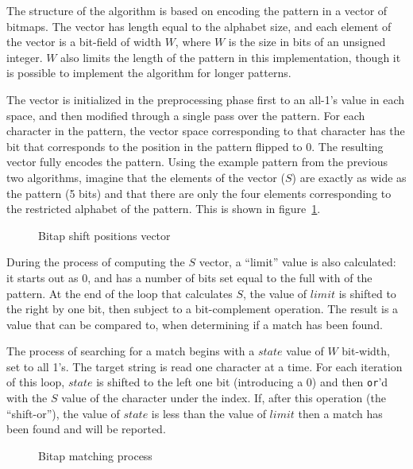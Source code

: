 The structure of the algorithm is based on encoding the pattern in a vector of bitmaps. The vector has length equal to the alphabet size, and each element of the vector is a bit-field of width $W$, where $W$ is the size in bits of an unsigned integer. $W$ also limits the length of the pattern in this implementation, though it is possible to implement the algorithm for longer patterns.

The vector is initialized in the preprocessing phase first to an all-1's value in each space, and then modified through a single pass over the pattern. For each character in the pattern, the vector space corresponding to that character has the bit that corresponds to the position in the pattern flipped to 0. The resulting vector fully encodes the pattern. Using the example pattern from the previous two algorithms, imagine that the elements of the vector ($S$) are exactly as wide as the pattern (5 bits) and that there are only the four elements corresponding to the restricted alphabet of the pattern. This is shown in figure~\ref{fig:bitap_s_positions}.

\begin{figure}[ht]
\centering

\caption{Bitap shift positions vector}
\label{fig:bitap_s_positions}
\end{figure}

During the process of computing the $S$ vector, a ``limit'' value is also calculated: it starts out as 0, and has a number of bits set equal to the full with of the pattern. At the end of the loop that calculates $S$, the value of $limit$ is shifted to the right by one bit, then subject to a bit-complement operation. The result is a value that can be compared to, when determining if a match has been found.

The process of searching for a match begins with a $state$ value of $W$ bit-width, set to all 1's. The target string is read one character at a time. For each iteration of this loop, $state$ is shifted to the left one bit (introducing a 0) and then \texttt{or}'d with the $S$ value of the character under the index. If, after this operation (the ``shift-or''), the value of $state$ is less than the value of $limit$ then a match has been found and will be reported.

\begin{figure}[ht]
\centering

\caption{Bitap matching process}
\label{fig:bitap_matching}
\end{figure}

